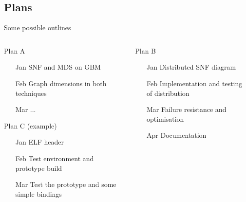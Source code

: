 \documentclass[hyperref={colorlinks=true}]{beamer}
\begin{document}
\subsection{Plans}
\begin{frame}{Some possible outlines}
  \begin{columns}[T]
  \begin{column}{.5\textwidth}
    \begin{block}{Plan A}
      \begin{itemize}
       \item[Jan] SNF and MDS on GBM
       \item[Feb] Graph dimensions in both techniques
       \item[Mar] ...
      \end{itemize}
    \end{block}
    \begin{block}{Plan C (example)}
      \begin{itemize}
       \item[Jan] ELF header
       \item[Feb] Test environment and prototype build
       \item[Mar] Test the prototype and some simple bindings
      \end{itemize}
    \end{block}
  \end{column}
  \begin{column}{.5\textwidth}
    \begin{block}{Plan B}
      \begin{itemize}
       \item[Jan] Distributed SNF diagram
       \item[Feb] Implementation and testing of distribution
       \item[Mar] Failure resistance and optimisation
       \item[Apr] Documentation
      \end{itemize}
    \end{block}
  \end{column}
  \end{columns}
\end{frame}
\end{document}
